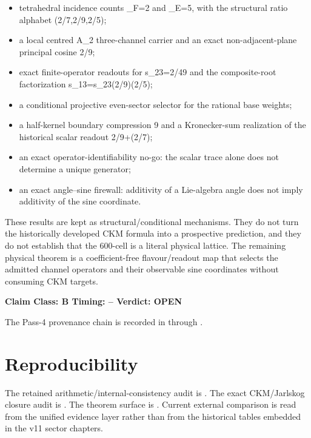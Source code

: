 \documentclass[11pt,a4paper,twoside]{book}
\def\({}%
\def\){}%
\theoremstyle{definition}
\newcommand{\vTwelveStatus}[3]{\par\noindent\textbf{Claim Class: #1 \quad Timing: #2 \quad Verdict: #3}\par}
\begin{document}
\begin{itemize}
\item tetrahedral incidence counts \(\nu_F=2\) and \(\nu_E=5\), with
      the structural ratio alphabet \((2/7,2/9,2/5)\);
\item a local centred \(A_2\) three-channel carrier and an exact
      non-adjacent-plane principal cosine \(2/9\);
\item exact finite-operator readouts for \(s_{23}=2/49\) and the
      composite-root factorization \(s_{13}=s_{23}(2/9)(2/5)\);
\item a conditional projective even-sector selector for the rational base
      weights;
\item a half-kernel boundary compression \(9\) and a Kronecker-sum
      realization of the historical scalar readout \(2/9+(2/7)\kappa\);
\item an exact operator-identifiability no-go: the scalar trace alone does not
      determine a unique generator;
\item an exact angle--sine firewall: additivity of a Lie-algebra angle does not
      imply additivity of the sine coordinate.
\end{itemize}

These results are kept as structural/conditional mechanisms.  They do not turn
the historically developed CKM formula into a prospective prediction, and they
do not establish that the 600-cell is a literal physical lattice.  The
remaining physical theorem is a coefficient-free flavour/readout map that
selects the admitted channel operators and their observable sine coordinates
without consuming CKM targets.

\vTwelveStatus{B}{--}{OPEN}

The Pass-4 provenance chain is recorded in
through
.

\section{Reproducibility}
The retained arithmetic/internal-consistency audit is
.
The exact CKM/Jarlskog closure audit is
.
The theorem surface is
.
Current external comparison is read from the unified evidence layer rather than
from the historical tables embedded in the v11 sector chapters.
\end{document}
